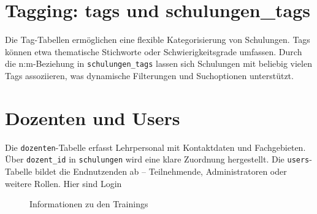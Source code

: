\section{Tagging: tags und schulungen\_tags}
Die Tag-Tabellen ermöglichen eine flexible Kategorisierung von Schulungen. Tags können etwa thematische Stichworte oder Schwierigkeitsgrade umfassen. Durch die n:m-Beziehung in \texttt{schulungen\_tags} lassen sich Schulungen mit beliebig vielen Tags assoziieren, was dynamische Filterungen und Suchoptionen unterstützt.

\section{Dozenten und Users}
Die \texttt{dozenten}-Tabelle erfasst Lehrpersonal mit Kontaktdaten und Fachgebieten. Über \texttt{dozent\_id} in \texttt{schulungen} wird eine klare Zuordnung hergestellt. Die \texttt{users}-Tabelle bildet die Endnutzenden ab – Teilnehmende, Administratoren oder weitere Rollen. Hier sind Login





\begin{figure}[p]
    \centering
    \caption{Informationen zu den Trainings}
    \label{MAriaDB}
\end{figure}

